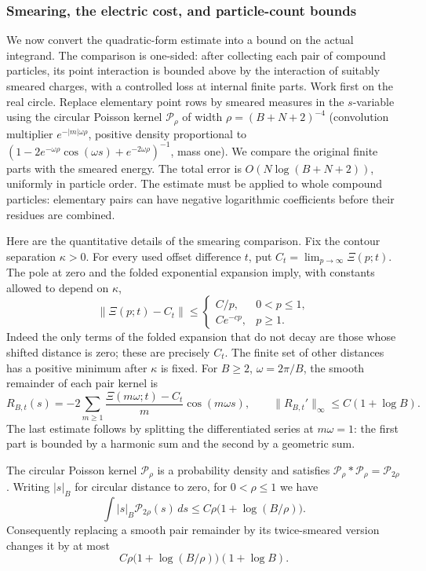 \subsubsection{Smearing, the electric cost, and particle-count bounds}
We now convert the quadratic-form estimate into a bound on the actual
integrand. The comparison is one-sided: after collecting each pair of
compound particles, its point interaction is bounded above by the
interaction of suitably smeared charges, with a controlled loss at
internal finite parts. Work first on the real circle. Replace elementary point rows by smeared measures in the \(s\)-variable using the circular Poisson kernel \(\mathcal P_\rho\) of width \(\rho=(B+N+2)^{-4}\) (convolution multiplier \(e^{-|m|\omega\rho}\), positive density proportional to \((1-2e^{-\omega\rho}\cos(\omega s)+e^{-2\omega\rho})^{-1}\), mass one). We compare the original finite parts with the smeared energy. The total
error is \(O(N\log(B+N+2))\), uniformly in particle order. The estimate
must be applied to whole compound particles: elementary pairs can have
negative logarithmic coefficients before their residues are combined.


Here are the quantitative details of the smearing comparison.  Fix the
contour separation $\kappa>0$.  For every used offset difference $t$,
put $C_t=\lim_{p\to\infty}\Xi(p;t)$.  The pole at zero and the folded
exponential expansion imply, with constants allowed to depend on
$\kappa$,
\[
 \|\Xi(p;t)-C_t\|\le
 \begin{cases}C/p,&0<p\le1,\\ Ce^{-cp},&p\ge1.\end{cases}
\]
Indeed the only terms of the folded expansion that do not decay are
those whose shifted distance is zero; these are precisely $C_t$.
The finite set of other distances has a positive minimum after
$\kappa$ is fixed.  For $B\ge2$, $\omega=2\pi/B$, the smooth remainder
of each pair kernel is
\[
 R_{B,t}(s)=-2\sum_{m\ge1}
          \frac{\Xi(m\omega;t)-C_t}{m}\cos(m\omega s),
 \qquad \|R_{B,t}'\|_\infty\le C(1+\log B).
\]
The last estimate follows by splitting the differentiated series at
$m\omega=1$: the first part is bounded by a harmonic sum and the
second by a geometric sum.

The circular Poisson kernel $\mathcal P_\rho$ is a probability density
and satisfies $\mathcal P_\rho*\mathcal P_\rho=\mathcal P_{2\rho}$.
Writing $|s|_B$ for circular distance to zero, for $0<\rho\le1$ we have
\[
 \int |s|_B\mathcal P_{2\rho}(s)\,ds
       \le C\rho\bigl(1+\log(B/\rho)\bigr).
\]
Consequently replacing a smooth pair remainder by its twice-smeared
version changes it by at most
\[
 C\rho\bigl(1+\log(B/\rho)\bigr)(1+\log B).
\]

